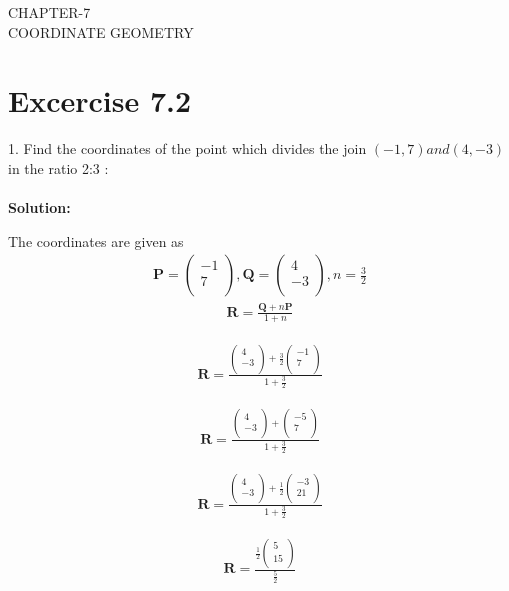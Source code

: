 \documentclass[12pt]{article}
\providecommand{\brak}[1]{\ensuremath{\left(#1\right)}}
\newcommand{\solution}{\noindent \textbf{Solution: }}
\newcommand{\myvec}[1]{\ensuremath{\begin{pmatrix}#1\end{pmatrix}}}
\let\vec\mathbf
\begin{document}
\begin{center}
\textbf\large{CHAPTER-7 \\ COORDINATE GEOMETRY}
\end{center}
\section*{Excercise 7.2}

1. Find the coordinates of the point which divides the join $\brak{-1,7} and \brak{4,-3}$ in the ratio 2:3 :
\\
\\
\solution

 The coordinates are given as
\begin{align}
\vec{P} = \myvec{
-1\\
7\\
},
\vec{Q} = \myvec{
4\\
-3\\
},  n=\frac{3}{2}
\end{align}
\begin{align}
\vec{R} =\frac{\vec{Q}+n\vec{P}}{1+n}
\end{align}


\begin{align}
\vec{R}=\frac{\myvec{
4\\
-3\\
}
  +
   \frac{3}{2}\myvec{
-1\\
7\\
}}{1+\frac{3}{2}}
\end{align}

\begin{align}
\vec{R}=\frac{\myvec{
4\\
-3\\
}
  +
  \myvec{
-5\\
7\\
}}{1+\frac{3}{2}}
\end{align}

\begin{align}
\vec{R}=\frac{\myvec{
4\\
-3\\
}
  +
  \frac{1}{2}\myvec{
-3\\
21\\
}}{1+\frac{3}{2}}
\end{align}
 
\begin{align}
\vec{R}=\frac{\frac{1}{2}\myvec{
5\\
15\\
}}
  {\frac{5}{2}}
\end{align}
\end{document}
